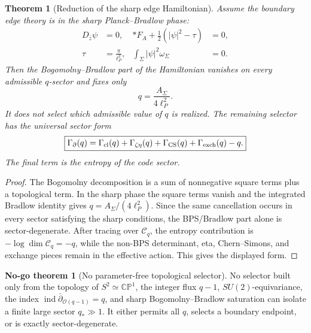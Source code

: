 \documentclass[aps,prd,reprint,nofootinbib,superscriptaddress,floatfix]{revtex4-2}
\numberwithin{equation}{section}
\theoremstyle{definition}
\newtheorem{nogotheorem}{No-go theorem}[section]
\theoremstyle{plain}
\newtheorem{theorem}{Theorem}[section]
\newcommand{\CP}{\mathbb{CP}}
\begin{document}
\begin{theorem}[Reduction of the sharp edge Hamiltonian]
\label{thm:edge-selector-reduction}
Assume the boundary edge theory is in the sharp Planck--Bradlow phase:
\begin{align}
D_{\bar z}\psi&=0,
&
*F_A+\frac12(|\psi|^2-\tau)&=0,
\\
\tau&=\frac{\pi}{\ell_P^2},
&
\int_\Sigma|\psi|^2\omega_\Sigma&=0 .
\end{align}
Then the Bogomolny--Bradlow part of the Hamiltonian vanishes on every
admissible \(q\)-sector and fixes only
\begin{equation}
q=\frac{A_\Sigma}{4\ell_P^2}.
\end{equation}
It does not select which admissible value of \(q\) is realized.
The remaining selector has the universal sector form
\begin{equation}
\boxed{
\Gamma_\partial(q)
=
\Gamma_{\rm cl}(q)
+\Gamma_{\zeta\eta}(q)
+\Gamma_{\rm CS}(q)
+\Gamma_{\rm exch}(q)
-q .
}
\end{equation}
The final term is the entropy of the code sector.
\end{theorem}

\begin{proof}
The Bogomolny decomposition is a sum of nonnegative square terms plus a
topological term.  In the sharp phase the square terms vanish and the
integrated Bradlow identity gives \(q=A_\Sigma/(4\ell_P^2)\).  Since the
same cancellation occurs in every sector satisfying the sharp conditions,
the BPS/Bradlow part alone is sector-degenerate.  After tracing over
\(\mathcal C_q\), the entropy contribution is \(-\log\dim\mathcal C_q=-q\),
while the non-BPS determinant, eta, Chern--Simons, and exchange pieces
remain in the effective action.  This gives the displayed form.
\end{proof}

\begin{nogotheorem}[No parameter-free topological selector]
\label{nogo:parameter-free-selector}
No selector built only from the topology of \(S^2\simeq\CP^1\), the
integer flux \(q-1\), \(SU(2)\)-equivariance, the index
\(\operatorname{ind}\bar\partial_{\mathcal O(q-1)}=q\), and sharp
Bogomolny--Bradlow saturation can isolate a finite large sector
\(q_*\gg1\).  It either permits all \(q\), selects a boundary endpoint,
or is exactly sector-degenerate.
\end{nogotheorem}
\end{document}
